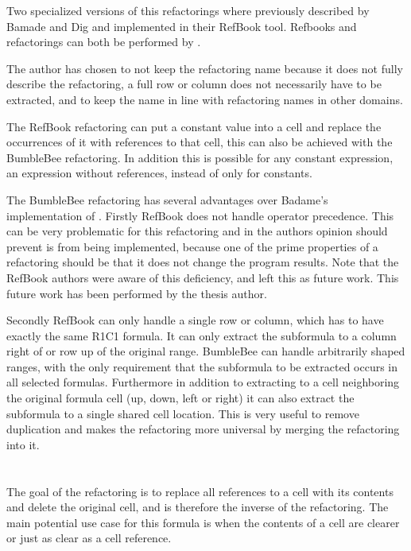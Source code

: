 Two specialized versions of this refactorings where previously described by Bamade and Dig \cite{badame2012refactoring} and implemented in their RefBook tool.
Refbooks  and  refactorings can both be performed by .

The author has chosen to not keep the  refactoring name because it does not fully describe the refactoring, a full row or column does not necessarily have to be extracted, and to keep the name in line with refactoring names in other domains.

The RefBook  refactoring can put a constant value into a cell and replace the occurrences of it with references to that cell, this can also be achieved with the BumbleBee  refactoring.
In addition this is possible for any constant expression, an expression without references, instead of only for constants.

The BumbleBee  refactoring has several advantages over Badame's implementation of .
Firstly RefBook does not handle operator precedence.
This can be very problematic for this refactoring and in the authors opinion should prevent is from being implemented, because one of the prime properties of a refactoring should be that it does not change the program results.
Note that the RefBook authors were aware of this deficiency, and left this as future work.
This future work has been performed by the thesis author.

Secondly RefBook can only handle a single row or column, which has to have exactly the same R1C1 formula. It can only extract the subformula to a column right of or row up of the original range.
BumbleBee can handle arbitrarily shaped ranges, with the only requirement that the subformula to be extracted occurs in all selected formulas.
Furthermore in addition to extracting to a cell neighboring the original formula cell (up, down, left or right) it can also extract the subformula to a single shared cell location.
This is very useful to remove duplication and makes the refactoring more universal by merging the  refactoring into it.

\section{}

The goal of the  refactoring is to replace all references to a cell with its contents and delete the original cell, and is therefore the inverse of the  refactoring.
The main potential use case for this formula is when the contents of a cell are clearer or just as clear as a cell reference.

